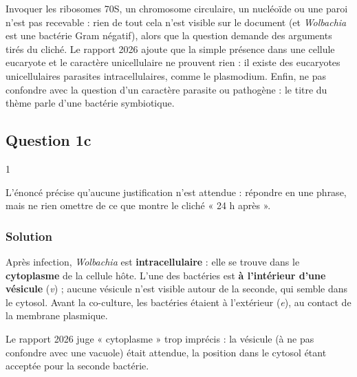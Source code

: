 \documentclass[11pt,a4paper]{article}
\begin{document}
\begin{piege}

Invoquer les ribosomes 70S, un chromosome circulaire, un nucléoïde ou une paroi n'est pas recevable : rien de tout cela n'est visible sur le document (et \emph{Wolbachia} est une bactérie Gram négatif), alors que la question demande des arguments tirés du cliché. Le rapport 2026 ajoute que la simple présence dans une cellule eucaryote et le caractère unicellulaire ne prouvent rien : il existe des eucaryotes unicellulaires parasites intracellulaires, comme le plasmodium. Enfin, ne pas confondre avec la question d'un caractère parasite ou pathogène : le titre du thème parle d'une bactérie symbiotique.

\end{piege}

\hypertarget{question-1c}{%
\subsection{Question 1c}\label{question-1c}}

\begin{indication}{1}

L'énoncé précise qu'aucune justification n'est attendue : répondre en une phrase, mais ne rien omettre de ce que montre le cliché « 24 h après ».

\end{indication}

\hypertarget{solution-43}{%
\subsubsection{Solution}\label{solution-43}}

Après infection, \emph{Wolbachia} est \textbf{intracellulaire} : elle se trouve dans le \textbf{cytoplasme} de la cellule hôte. L'une des bactéries est \textbf{à l'intérieur d'une vésicule} (\emph{v}) ; aucune vésicule n'est visible autour de la seconde, qui semble dans le cytosol. Avant la co-culture, les bactéries étaient à l'extérieur (\emph{e}), au contact de la membrane plasmique.

\begin{jury}

Le rapport 2026 juge « cytoplasme » trop imprécis : la vésicule (à ne pas confondre avec une vacuole) était attendue, la position dans le cytosol étant acceptée pour la seconde bactérie.

\end{jury}
\end{document}

